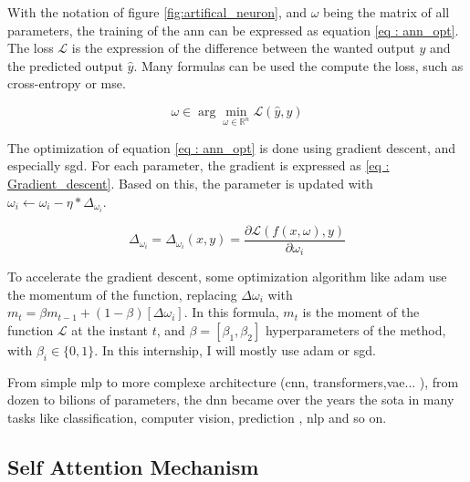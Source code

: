 With the notation of figure \ref{fig:artifical_neuron}, and $\omega$ being the matrix of all parameters, the training of the \acrshort{ann} can be expressed as equation \ref{eq : ann_opt}. The loss $\mathcal L$ is the expression of the difference between the wanted output $y$ and the predicted output $\hat y$. Many formulas can be used the compute the loss, such as cross-entropy\cite{zhang_generalized_2018} or \acrfull{mse}.

\begin{equation}
    \omega \in \arg \min_{\omega \in \mathbb R^n} \mathcal L(\hat{y},y)
    \label{eq : ann_opt}
\end{equation}

The optimization of equation \ref{eq : ann_opt} is done using gradient descent, and especially \acrfull{sgd}. For each parameter, the gradient is expressed as \ref{eq : Gradient_descent}. Based on this, the parameter is updated with $\omega_{i} \gets \omega_i - \eta * \Delta_{\omega_i}$.

\begin{equation}
    \Delta_{\omega_i}=\Delta_{\omega_i}(x,y)=\frac{\partial \mathcal L(f(x,\omega),y)}{\partial \omega_i}
\label{eq : Gradient_descent}
\end{equation}

To accelerate the gradient descent, some optimization algorithm like \acrfull{adam} \cite{kingma_adam_2017} use the momentum of the function, replacing $\Delta \omega_i$ with $m_t = \beta m_{t-1}+(1-\beta)[\Delta \omega_i]$. In this formula, $m_t$ is the moment of the function $\mathcal L$ at the instant $t$, and $\beta = [\beta_1, \beta_2]$ \glspl{hyperparameter} of the method, with $\beta_i \in \{0,1\}$. In this internship, I will mostly use \acrshort{adam} or \acrshort{sgd}.

From simple \acrfull{mlp} to more complexe architecture (\acrfull{cnn}, \Glspl{transformer},\acrfull{vae}... ), from dozen to bilions of parameters, the \acrshort{dnn} became over the years the \acrfull{sota} in many tasks like classification\cite{zhang_neural_2000}, computer vision\cite{rawat_deep_2017}, prediction \cite{khosravi_comprehensive_2011}, \acrshort{nlp}\cite{goldberg_primer_2016} and so on.

\subsection{Self Attention Mechanism}
\label{sec:self_att}

